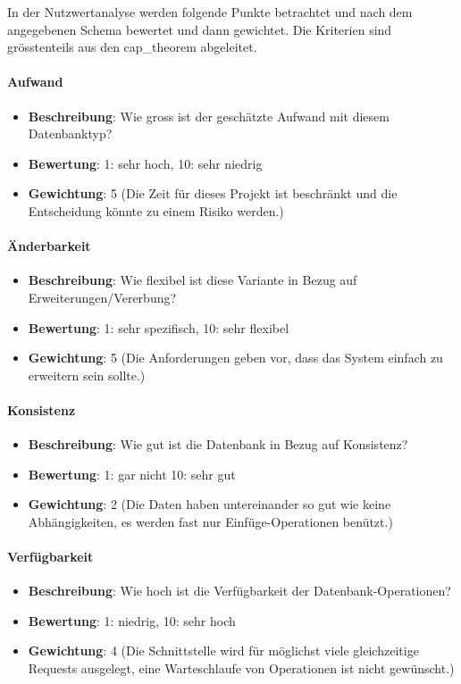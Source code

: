 In der Nutzwertanalyse werden folgende Punkte betrachtet und nach dem angegebenen Schema bewertet und dann gewichtet. 
Die Kriterien sind grösstenteils aus den \gls{cap_theorem} abgeleitet.

\paragraph{Aufwand}
\begin{itemize}
	\item \textbf{Beschreibung}: Wie gross ist der geschätzte Aufwand mit diesem Datenbanktyp?
	\item \textbf{Bewertung}: 1: sehr hoch, 10: sehr niedrig
	\item \textbf{Gewichtung}: 5 (Die Zeit für dieses Projekt ist beschränkt und die Entscheidung könnte zu einem Risiko werden.)
\end{itemize}

\paragraph{Änderbarkeit}
\begin{itemize}
	\item \textbf{Beschreibung}: Wie flexibel ist diese Variante in Bezug auf Erweiterungen/Vererbung?
	\item \textbf{Bewertung}: 1: sehr spezifisch, 10: sehr flexibel
	\item \textbf{Gewichtung}: 5 (Die Anforderungen geben vor, dass das System einfach zu erweitern sein sollte.)
\end{itemize}

\paragraph{Konsistenz}
\begin{itemize}
	\item \textbf{Beschreibung}: Wie gut ist die Datenbank in Bezug auf Konsistenz?
	\item \textbf{Bewertung}: 1: gar nicht 10: sehr gut
	\item \textbf{Gewichtung}: 2 (Die Daten haben untereinander so gut wie keine Abhängigkeiten, es werden fast nur Einfüge-Operationen benützt.)
\end{itemize}

\paragraph{Verfügbarkeit}
\begin{itemize}
	\item \textbf{Beschreibung}: Wie hoch ist die Verfügbarkeit der Datenbank-Operationen?
	\item \textbf{Bewertung}: 1: niedrig, 10: sehr hoch
	\item \textbf{Gewichtung}: 4 (Die Schnittstelle wird für möglichst viele gleichzeitige Requests ausgelegt, eine Warteschlaufe von Operationen ist nicht gewünscht.)
\end{itemize}

